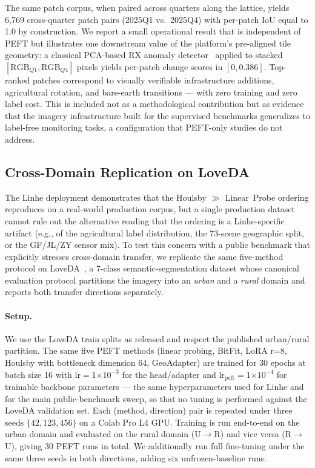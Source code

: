 The same patch corpus, when paired across quarters along the lattice, yields 6{,}769 cross-quarter patch pairs (2025Q1 vs.\ 2025Q4) with per-patch IoU equal to 1.0 by construction. We report a small operational result that is independent of PEFT but illustrates one downstream value of the platform's pre-aligned tile geometry: a classical PCA-based RX anomaly detector~\cite{reed1990rx} applied to stacked $[\text{RGB}_{Q1}, \text{RGB}_{Q4}]$ pixels yields per-patch change scores in $[0, 0.386]$. Top-ranked patches correspond to visually verifiable infrastructure additions, agricultural rotation, and bare-earth transitions --- with zero training and zero label cost. This is included not as a methodological contribution but as evidence that the imagery infrastructure built for the supervised benchmarks generalizes to label-free monitoring tasks, a configuration that PEFT-only studies do not address.

\subsection{Cross-Domain Replication on LoveDA}
\label{sec:loveda}

The Linhe deployment demonstrates that the Houlsby $\gg$ Linear~Probe ordering reproduces on a real-world production corpus, but a single production dataset cannot rule out the alternative reading that the ordering is a Linhe-specific artifact (e.g., of the agricultural label distribution, the 73-scene geographic split, or the GF/JL/ZY sensor mix). To test this concern with a public benchmark that explicitly stresses cross-domain transfer, we replicate the same five-method protocol on LoveDA~\cite{wang2021loveda}, a 7-class semantic-segmentation dataset whose canonical evaluation protocol partitions the imagery into an \emph{urban} and a \emph{rural} domain and reports both transfer directions separately.

\paragraph{Setup.} We use the LoveDA train splits as released and respect the published urban/rural partition. The same five PEFT methods (linear probing, BitFit, LoRA r=8, Houlsby with bottleneck dimension 64, GeoAdapter) are trained for 30 epochs at batch size 16 with lr$=$1$\times 10^{-3}$ for the head/adapter and lr$_{\mathrm{peft}}$$=$1$\times 10^{-4}$ for trainable backbone parameters --- the same hyperparameters used for Linhe and for the main public-benchmark sweep, so that no tuning is performed against the LoveDA validation set. Each (method, direction) pair is repeated under three seeds $\{42, 123, 456\}$ on a Colab Pro L4 GPU. Training is run end-to-end on the urban domain and evaluated on the rural domain (U$\rightarrow$R) and vice versa (R$\rightarrow$U), giving 30 PEFT runs in total. We additionally run full fine-tuning under the same three seeds in both directions, adding six unfrozen-baseline runs.

